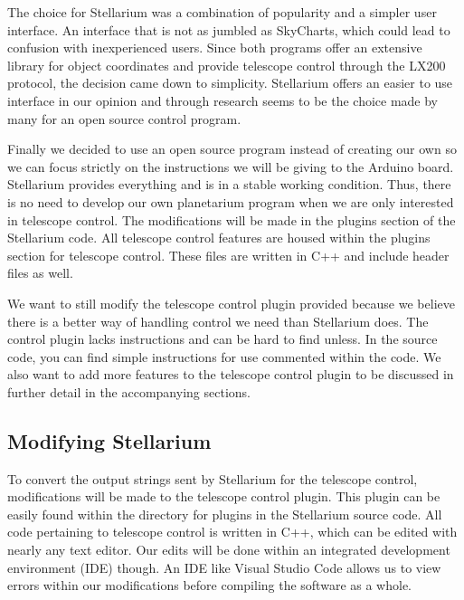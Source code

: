\documentclass[12pt]{report}
\begin{document}
The choice for Stellarium was a combination of popularity and a simpler user interface. An interface that is not as jumbled as SkyCharts, which could lead to confusion with inexperienced users. Since both programs offer an extensive library for object coordinates and provide telescope control through the LX200 protocol, the decision came down to simplicity. Stellarium offers an easier to use interface in our opinion and through research seems to be the choice made by many for an open source control program.

Finally we decided to use an open source program instead of creating our own so we can focus strictly on the instructions we will be giving to the Arduino board. Stellarium provides everything and is in a stable working condition. Thus, there is no need to develop our own planetarium program when we are only interested in telescope control. The modifications will be made in the plugins section of the Stellarium code. All telescope control features are housed within the plugins section for telescope control. These files are written in C++ and include header files as well.

We want to still modify the telescope control plugin provided because we believe there is a better way of handling control we need than Stellarium does. The control plugin lacks instructions and can be hard to find unless. In the source code, you can find simple instructions for use commented within the code. We also want to add more features to the telescope control plugin to be discussed in further detail in the accompanying sections.

\subsection*{Modifying Stellarium}

To convert the output strings sent by Stellarium for the telescope control, modifications will be made to the telescope control plugin. This plugin can be easily found within the directory for plugins in the Stellarium source code. All code pertaining to telescope control is written in C++, which can be edited with nearly any text editor. Our edits will be done within an integrated development environment (IDE) though. An IDE like Visual Studio Code allows us to view errors within our modifications before compiling the software as a whole.
\end{document}
